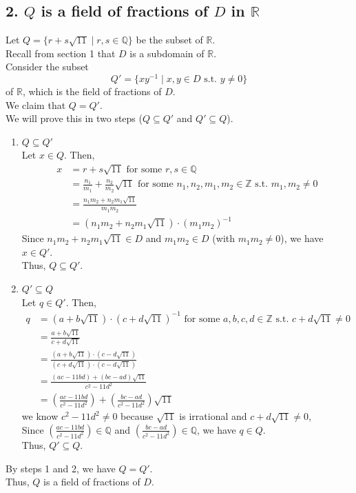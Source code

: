 \documentclass[11pt, a4paper]{article}
\begin{document}
\subsection*{2. $Q$ is a field of fractions of $D$ in $\mathbb{R}$}
Let $Q = \{ r + s\sqrt{11} \mid r, s \in \mathbb{Q} \}$ be the subset of $\mathbb{R}$.\\
Recall from section 1 that $D$ is a subdomain of $\mathbb{R}$.\\
Consider the subset 
\[
Q' = \{ xy^{-1} \mid x,y \in D \text{ s.t. } y \neq 0\}
\]
of $\mathbb{R}$, which is the field of fractions of $D$.\\
We claim that $Q = Q'$.\\
We will prove this in two steps ($Q \subseteq Q'$ and $Q' \subseteq Q$).

\begin{enumerate}
    \item $Q \subseteq Q'$\\
    Let $x \in Q$. Then,
    \begin{align*}
        x &= r+s\sqrt{11} \text{ for some } r,s \in \mathbb{Q}\\
        &= \frac{n_1}{m_1} + \frac{n_2}{m_2}\sqrt{11} \text{ for some } n_1, n_2, m_1, m_2 \in \mathbb{Z} \text{ s.t. } m_1, m_2 \neq 0\\
        &= \frac{n_1 m_2 + n_2 m_1\sqrt{11}}{m_1 m_2}\\
        &= (n_1 m_2 + n_2 m_1\sqrt{11}) \cdot (m_1 m_2)^{-1}
    \end{align*}
    Since $n_1 m_2 + n_2 m_1\sqrt{11} \in D$ and $m_1 m_2 \in D$ (with $m_1 m_2 \neq 0$), we have $x \in Q'$.\\
    Thus, $Q \subseteq Q'$.

    \item $Q' \subseteq Q$\\
    Let $q \in Q'$. Then,
    \begin{align*}
        q &= (a + b\sqrt{11}) \cdot (c + d\sqrt{11})^{-1} \text{ for some } a,b,c,d \in \mathbb{Z} \text{ s.t. } c + d\sqrt{11} \neq 0\\
        &= \frac{a + b\sqrt{11}}{c + d\sqrt{11}}\\
        &= \frac{(a + b\sqrt{11}) \cdot (c - d\sqrt{11})}{(c + d\sqrt{11}) \cdot (c - d\sqrt{11})}\\
        &= \frac{(ac - 11bd) + (bc - ad)\sqrt{11}}{c^2 - 11d^2}\\
        &= \left(\frac{ac - 11bd}{c^2 - 11d^2}\right) + \left(\frac{bc - ad}{c^2 - 11d^2}\right)\sqrt{11}
    \end{align*}
    we know $c^2 - 11d^2 \neq 0$ because $\sqrt{11}$ is irrational and $c+d\sqrt{11} \neq 0$, \\
    Since $\left(\frac{ac - 11bd}{c^2 - 11d^2}\right) \in \mathbb{Q}$ and
    $\left(\frac{bc - ad}{c^2 - 11d^2}\right) \in \mathbb{Q}$, we have $q \in Q$.\\
    Thus, $Q' \subseteq Q$.
\end{enumerate}
By steps 1 and 2, we have $Q=Q'$.\\
Thus, $Q$ is a field of fractions of $D$.
\end{document}
